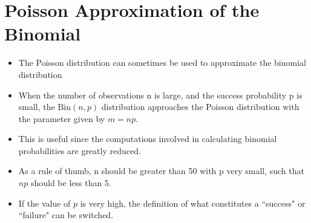 \documentclass[a4paper,12pt]{article}
\begin{document}
\section{Poisson Approximation of the Binomial}
\begin{itemize}
\item The Poisson distribution can sometimes be used to approximate the binomial distribution
\item When the number of observations n is large, and the success probability p is small, the $\mbox{Bin}(n,p)$ distribution approaches the Poisson distribution 
with the parameter given by $m = np$.
\item This is useful since the computations involved in calculating binomial probabilities are greatly reduced.
\item As a rule of thumb, n should be greater than 50 with p very small, such that $np$ should be less than 5.
\item If the value of $p$ is very high, the definition of what constitutes a ``success" or ``failure" can be switched.
\end{itemize}
\end{document}
